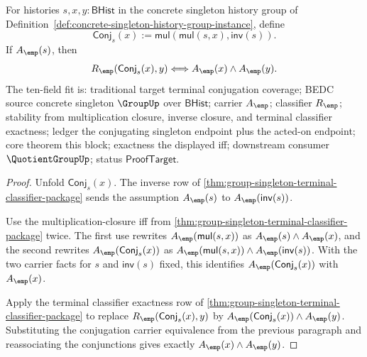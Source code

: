 
\begin{theorem}
\label{thm:group-singleton-conjugation-classifier-coverage}
For histories $s,x,y:\mathsf{BHist}$ in the concrete singleton history group of
Definition~\ref{def:concrete-singleton-history-group-instance}, define
$$
\mathsf{Conj}_s(x):=\mathsf{mul}(\mathsf{mul}(s,x),\mathsf{inv}(s)).
$$
If $A_{\emp}(s)$, then
$$
R_{\emp}(\mathsf{Conj}_s(x),y)\Longleftrightarrow
A_{\emp}(x)\land A_{\emp}(y).
$$
The ten-field fit is: traditional target terminal conjugation coverage; BEDC
source concrete singleton $\GroupUp$ over $\mathsf{BHist}$; carrier
$A_{\emp}$; classifier $R_{\emp}$; stability from multiplication closure,
inverse closure, and terminal classifier exactness; ledger the conjugating
singleton endpoint plus the acted-on endpoint; core theorem this block;
exactness the displayed iff; downstream consumer $\QuotientGroupUp$; status
$\mathsf{ProofTarget}$.
\end{theorem}
\begin{proof}
Unfold $\mathsf{Conj}_s(x)$. The inverse row of
\autoref{thm:group-singleton-terminal-classifier-package} sends the assumption
$A_{\emp}(s)$ to $A_{\emp}(\mathsf{inv}(s))$.

Use the multiplication-closure iff from
\autoref{thm:group-singleton-terminal-classifier-package} twice. The first use
rewrites $A_{\emp}(\mathsf{mul}(s,x))$ as
$A_{\emp}(s)\land A_{\emp}(x)$, and the second rewrites
$A_{\emp}(\mathsf{Conj}_s(x))$ as
$A_{\emp}(\mathsf{mul}(s,x))\land A_{\emp}(\mathsf{inv}(s))$. With the two
carrier facts for $s$ and $\mathsf{inv}(s)$ fixed, this identifies
$A_{\emp}(\mathsf{Conj}_s(x))$ with $A_{\emp}(x)$.

Apply the terminal classifier exactness row of
\autoref{thm:group-singleton-terminal-classifier-package} to replace
$R_{\emp}(\mathsf{Conj}_s(x),y)$ by
$A_{\emp}(\mathsf{Conj}_s(x))\land A_{\emp}(y)$. Substituting the conjugation
carrier equivalence from the previous paragraph and reassociating the
conjunctions gives exactly
$A_{\emp}(x)\land A_{\emp}(y)$.
\end{proof}

